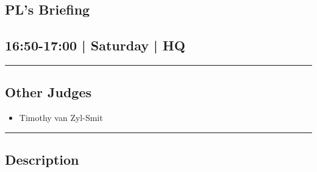 \documentclass[10pt, A5]{article}
\begin{document}
		\begin{framed}
			\begin{minipage}{\textwidth}

			\setcounter{section}{61}
							\section{PL's Briefing}
						
			\subsection*{16:50-17:00 | Saturday | HQ}

			\vspace{0.25cm}
			\hrule
			\vspace{0.25cm}


			\subsection*{Other Judges}
							

				\begin{multicols}{2}

			\begin{itemize}
											\item Timothy van Zyl-Smit
								\end{itemize}

			\vfill\null
			\columnbreak

			\begin{itemize}
								\end{itemize}

			\vfill\null

			\end{multicols}

			\vspace{0.25cm}
			\hrule
			\vspace{0.25cm}

			\begin{minipage}{\textwidth}
			\subsection*{\faListAlt \: Description}
			
			\end{minipage}


	\end{minipage}
	\end{framed}

	
\end{document}
